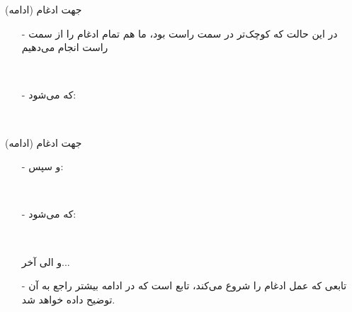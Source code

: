 \begin{frame}{جهت ادغام (ادامه)}
\begin{itemize}\itemr
\item[-]
در این حالت که 
کوچک‌تر در سمت راست بود، ما هم تمام ادغام را از سمت راست انجام می‌دهیم

\begin{lfl}
\\
\end{lfl}

\item[-]
که می‌شود:
\begin{lfl}
\\
\end{lfl}
\end{itemize}
\end{frame}

\begin{frame}{جهت ادغام (ادامه)}
\begin{itemize}\itemr
\item[-]
و سپس:
\begin{lfl}
\\
\end{lfl}

\item[-]
که می‌شود:
\begin{lfl}
\\
\end{lfl}
و الی آخر...

\item[-]
تابعی که عمل ادغام را شروع می‌کند، تابع
است که در ادامه بیشتر راجع به آن توضیح داده خواهد شد.
\end{itemize}
\end{frame}
